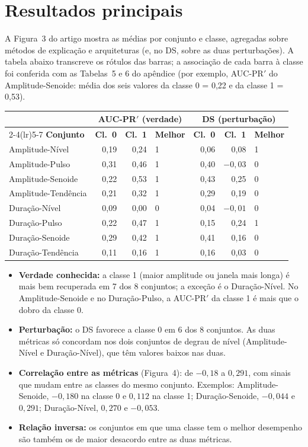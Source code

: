 \documentclass[11pt,a4paper]{article}
\begin{document}
\section{Resultados principais}
A Figura~3 do artigo mostra as médias por conjunto e classe, agregadas sobre métodos de explicação e arquiteturas (e, no DS, sobre as duas perturbações). A tabela abaixo transcreve os rótulos das barras; a associação de cada barra à classe foi conferida com as Tabelas~5 e 6 do apêndice (por exemplo, AUC-PR$'$ do Amplitude-Senoide: média dos seis valores da classe 0 = 0,22 e da classe 1 = 0,53).
\begin{center}\small
\begin{tabular}{lrrlrrl}
\toprule
& \multicolumn{3}{c}{\textbf{AUC-PR$'$ (verdade)}} & \multicolumn{3}{c}{\textbf{DS (perturbação)}} \\
\cmidrule(lr){2-4}\cmidrule(lr){5-7}
\textbf{Conjunto} & \textbf{Cl.\ 0} & \textbf{Cl.\ 1} & \textbf{Melhor} & \textbf{Cl.\ 0} & \textbf{Cl.\ 1} & \textbf{Melhor} \\
\midrule
Amplitude-Nível     & 0,19 & 0,24 & 1 & 0,06 & 0,08 & 1 \\
Amplitude-Pulso     & 0,31 & 0,46 & 1 & 0,40 & $-0{,}03$ & 0 \\
Amplitude-Senoide   & 0,22 & 0,53 & 1 & 0,43 & 0,25 & 0 \\
Amplitude-Tendência & 0,21 & 0,32 & 1 & 0,29 & 0,19 & 0 \\
Duração-Nível       & 0,09 & 0,00 & 0 & 0,04 & $-0{,}01$ & 0 \\
Duração-Pulso       & 0,22 & 0,47 & 1 & 0,15 & 0,24 & 1 \\
Duração-Senoide     & 0,29 & 0,42 & 1 & 0,41 & 0,16 & 0 \\
Duração-Tendência   & 0,11 & 0,16 & 1 & 0,16 & 0,03 & 0 \\
\bottomrule
\end{tabular}
\end{center}
\begin{itemize}
\item \textbf{Verdade conhecida:} a classe 1 (maior amplitude ou janela mais longa) é mais bem recuperada em 7 dos 8 conjuntos; a exceção é o Duração-Nível. No Amplitude-Senoide e no Duração-Pulso, a AUC-PR$'$ da classe 1 é mais que o dobro da classe 0.
\item \textbf{Perturbação:} o DS favorece a classe 0 em 6 dos 8 conjuntos. As duas métricas só concordam nos dois conjuntos de degrau de nível (Amplitude-Nível e Duração-Nível), que têm valores baixos nas duas.
\item \textbf{Correlação entre as métricas} (Figura~4): de $-0{,}18$ a $0{,}291$, com sinais que mudam entre as classes do mesmo conjunto. Exemplos: Amplitude-Senoide, $-0{,}180$ na classe 0 e $0{,}112$ na classe 1; Duração-Senoide, $-0{,}044$ e $0{,}291$; Duração-Nível, $0{,}270$ e $-0{,}053$.
\item \textbf{Relação inversa:} os conjuntos em que uma classe tem o melhor desempenho são também os de maior desacordo entre as duas métricas.
\end{itemize}
\end{document}
